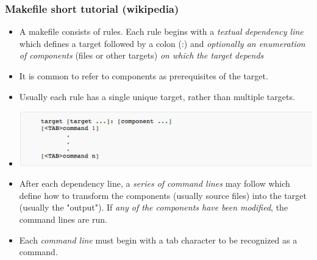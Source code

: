 \documentclass{beamer}
\begin{document}
\begin{frame}[fragile]
  \frametitle{Makefile short tutorial (wikipedia)}
  \footnotesize

\begin{itemize}
\item 
\alert{A makefile consists of rules}. Each rule begins with a \emph{textual dependency line} which defines a \alert{target} followed by a colon (:) and \emph{optionally an enumeration of components} (files or other targets) \emph{on which the target depends} 

\item 
It is common to refer to components as \alert{prerequisites} of the target.

\item 
Usually each rule has a \alert{single unique target}, rather than multiple targets.

\item[]
   \includegraphics[width=0.8\linewidth]{figs/makefile} 

\item 
After each dependency line, a \emph{series of command lines} may follow which define \alert{how to transform the components (usually source files) into the target (usually the "output")}. If \emph{any of the components have been modified}, the command lines are run.

\item 
Each \emph{command line} must begin with a \alert{tab character} to be recognized as a command. 
\end{itemize}


\end{frame}
\end{document}
